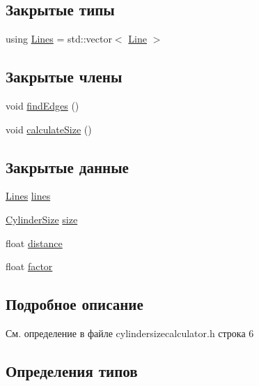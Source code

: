 \subsection*{Закрытые типы}
\begin{DoxyCompactItemize}
\item 
using \hyperlink{class_cylinder_size_calculator_a7c30882e5312856d6757dc0022eb231f}{Lines} = std\+::vector$<$ \hyperlink{class_line}{Line} $>$
\end{DoxyCompactItemize}
\subsection*{Закрытые члены}
\begin{DoxyCompactItemize}
\item 
void \hyperlink{class_cylinder_size_calculator_ad908e8325d6a03c7b4d1b55cf87eade9}{find\+Edges} ()
\item 
void \hyperlink{class_cylinder_size_calculator_a4afc5d76534bc67a394a0f78d21a4811}{calculate\+Size} ()
\end{DoxyCompactItemize}
\subsection*{Закрытые данные}
\begin{DoxyCompactItemize}
\item 
\hyperlink{class_cylinder_size_calculator_a7c30882e5312856d6757dc0022eb231f}{Lines} \hyperlink{class_cylinder_size_calculator_a8a329c2526e67545603769c720d76692}{lines}
\item 
\hyperlink{class_cylinder_size}{Cylinder\+Size} \hyperlink{class_cylinder_size_calculator_a13af96a82c344f22f3d2749d4dafa15c}{size}
\item 
float \hyperlink{class_cylinder_size_calculator_a1d88b87623a24582f968bb06acd80b8c}{distance}
\item 
float \hyperlink{class_cylinder_size_calculator_ad0ffced643e054737c077c3f654a4608}{factor}
\end{DoxyCompactItemize}


\subsection{Подробное описание}


См. определение в файле cylindersizecalculator.\+h строка 6



\subsection{Определения типов}
